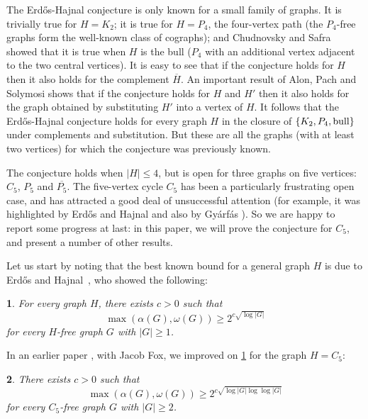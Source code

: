 \documentclass[titlepage,11pt]{article}
\newtheorem{thm}{}[section]
\begin{document}
The Erd\H{o}s-Hajnal conjecture is only known for a small family of graphs.  It is trivially true for $H=K_2$; it is true 
for $H=P_4$, the four-vertex path (the $P_4$-free graphs form the well-known class of cographs); and Chudnovsky and 
Safra~\cite{safra} showed that it is true when $H$ is the bull ($P_4$ with an additional vertex adjacent to the two central 
vertices).  It is easy to see that if the conjecture holds for $H$ then it also holds for the complement $\overline H$.  An 
important result of Alon, Pach and Solymosi \cite{aps} shows that if the conjecture holds for $H$ and $H'$ then it also holds for 
the graph obtained by substituting $H'$ into a vertex of $H$.   It follows that the Erd\H{o}s-Hajnal conjecture holds for every 
graph $H$ in the closure of 
$\{K_2, P_4, {\rm bull}\}$ under complements and substitution.  But these are all the graphs (with at least two vertices) for which the conjecture was previously known.

The conjecture holds when $|H|\leq 4$, but is open for three graphs on five vertices: $C_5$, $P_5$ and $\overline{P_5}$.  The five-vertex cycle $C_5$ has been a particularly frustrating open case, and has attracted a good deal of unsuccessful attention (for example, it was highlighted by Erd\H os and Hajnal \cite{EH} and also by Gy\'arf\'as \cite{Gy}).   
So we are happy to report some progress at last: in this paper, we will prove the conjecture for $C_5$, and present a number of other results.

Let us start by noting that the best known bound for a general graph $H$ is due to Erd\H os and Hajnal~\cite{EH}, who showed the following:

\begin{thm}\label{EHpartial}
For every graph $H$, there exists $c>0$ such that 
$$\max(\alpha(G),\omega(G))\ge 2^{c\sqrt{\log |G|}}$$
for every $H$-free graph $G$ with $|G|\geq1$.
\end{thm}

In an earlier paper \cite{c5close}, with Jacob Fox, we improved on \ref{EHpartial} for the graph $H=C_5$:
\begin{thm}\label{mainthm}
There exists $c>0$ such that 
$$\max(\alpha(G),\omega(G))\ge 2^{c\sqrt{\log  |G| \log \log  |G|  }}$$
for every $C_5$-free graph $G$ with $|G|\geq2$.
\end{thm}
\end{document}
